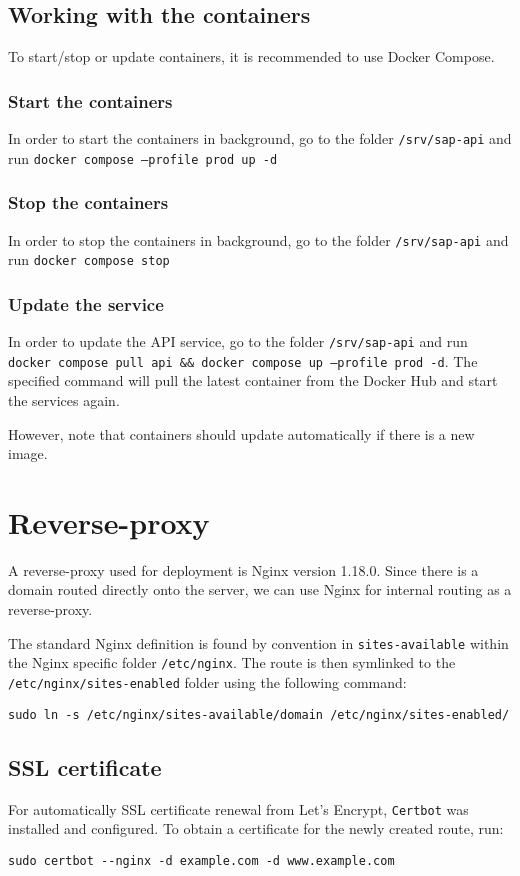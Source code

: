 \subsection{Working with the containers}
To start/stop or update containers, it is recommended to use Docker Compose.
\subsubsection{Start the containers}
In order to start the containers in background, go to the folder \texttt{/srv/sap-api} and run \texttt{docker compose --profile prod up -d}

\subsubsection{Stop the containers}
In order to stop the containers in background, go to the folder \texttt{/srv/sap-api} and run \texttt{docker compose stop}

\subsubsection{Update the service}
In order to update the API service, go to the folder \texttt{/srv/sap-api} and run \texttt{docker compose pull api \&\& docker compose up --profile prod -d}.
The specified command will pull the latest container from the Docker Hub and start the services again.

However, note that containers should update automatically if there is a new image.

\section{Reverse-proxy}
A reverse-proxy used for deployment is Nginx version 1.18.0.
Since there is a domain routed directly onto the server, we can use Nginx for internal routing as a reverse-proxy.

The standard Nginx definition is found by convention in \texttt{sites-available} within the Nginx specific folder \texttt{/etc/nginx}.
The route is then symlinked to the \texttt{/etc/nginx/sites-enabled} folder using the following command:
\begin{lstlisting}[caption={Command to create symbolic link by Nginx convention}]
sudo ln -s /etc/nginx/sites-available/domain /etc/nginx/sites-enabled/
\end{lstlisting}

\subsection{SSL certificate}
For automatically SSL certificate renewal from Let's Encrypt, \texttt{Certbot} was installed and configured.
To obtain a certificate for the newly created route, run:
\begin{lstlisting}[caption={Certbot command to obtain SSL certificate}]
sudo certbot --nginx -d example.com -d www.example.com
\end{lstlisting}






